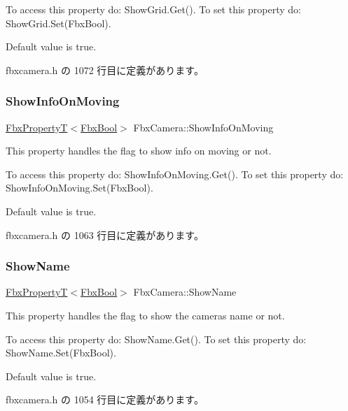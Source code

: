 To access this property do\+: Show\+Grid.\+Get(). To set this property do\+: Show\+Grid.\+Set(\+Fbx\+Bool).

Default value is true. 

 fbxcamera.\+h の 1072 行目に定義があります。

\mbox{\label{class_fbx_camera_a15b36db580c994a2676fd18d41923953}} 
\subsubsection{\texorpdfstring{Show\+Info\+On\+Moving}{ShowInfoOnMoving}}
{\footnotesize\ttfamily \hyperlink{class_fbx_property_t}{Fbx\+PropertyT}$<$\hyperlink{fbxtypes_8h_a92e0562b2fe33e76a242f498b362262e}{Fbx\+Bool}$>$ Fbx\+Camera\+::\+Show\+Info\+On\+Moving}

This property handles the flag to show info on moving or not.

To access this property do\+: Show\+Info\+On\+Moving.\+Get(). To set this property do\+: Show\+Info\+On\+Moving.\+Set(\+Fbx\+Bool).

Default value is true. 

 fbxcamera.\+h の 1063 行目に定義があります。

\mbox{\label{class_fbx_camera_a2cc4a7d5d9972b289c6d1a175e2adf1d}} 
\subsubsection{\texorpdfstring{Show\+Name}{ShowName}}
{\footnotesize\ttfamily \hyperlink{class_fbx_property_t}{Fbx\+PropertyT}$<$\hyperlink{fbxtypes_8h_a92e0562b2fe33e76a242f498b362262e}{Fbx\+Bool}$>$ Fbx\+Camera\+::\+Show\+Name}

This property handles the flag to show the camera\textquotesingle{}s name or not.

To access this property do\+: Show\+Name.\+Get(). To set this property do\+: Show\+Name.\+Set(\+Fbx\+Bool).

Default value is true. 

 fbxcamera.\+h の 1054 行目に定義があります。

\mbox{\label{class_fbx_camera_a76d80815967bce91e0fded44a6fbe74c}} 
